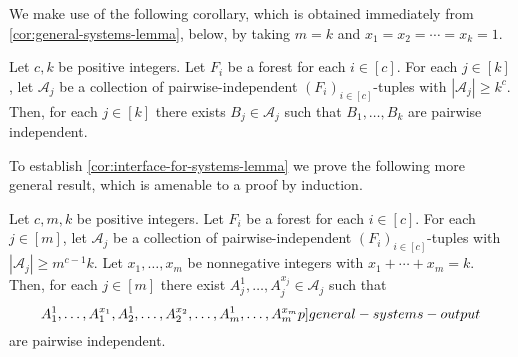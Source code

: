 \documentclass{patmorin}
\begin{document}
We make use of the following corollary, which is obtained immediately from \cref{cor:general-systems-lemma}, below, by  taking $m=k$ and $x_1=x_2=\cdots=x_k=1$.

\begin{cor}\label{cor:interface-for-systems-lemma}
  Let $c,k$ be positive integers. Let $F_i$ be a forest for each $i\in[c]$. For each $j\in [k]$, let $\mathcal{A}_j$ be a collection of pairwise-independent $(F_i)_{i\in[c]}$-tuples with $|\mathcal{A}_j|\geq k^c$. Then, for each $j\in[k]$ there exists $B_j \in \mathcal{A}_j$ such that $B_1,\ldots,B_k$ are pairwise independent.
\end{cor}

To establish \cref{cor:interface-for-systems-lemma} we prove the following more general result, which is amenable to a proof by induction.

\begin{lem}\label{cor:general-systems-lemma}
Let $c,m,k$ be positive integers. Let $F_i$ be a forest for each $i\in[c]$. For each $j\in [m]$, let $\mathcal{A}_j$ be a collection of pairwise-independent $(F_i)_{i\in[c]}$-tuples with $|\mathcal{A}_j|\geq m^{c-1}k$. Let $x_1,\ldots,x_m$ be nonnegative integers with $x_1+\cdots+x_m=k$. Then, for each $j\in[m]$ there exist $A_j^{1},\ldots,A_j^{x_j}\in \mathcal{A}_j$ such that
\begin{equation}
  A_1^{1},\ldots,A_1^{x_1},A_2^{1},\ldots,A_2^{x_2},\ldots,A_m^{1},\ldots,A_m^{x_m}  \label[p]{general-systems-output}
\end{equation}
are pairwise independent.
\end{lem}
\end{document}
